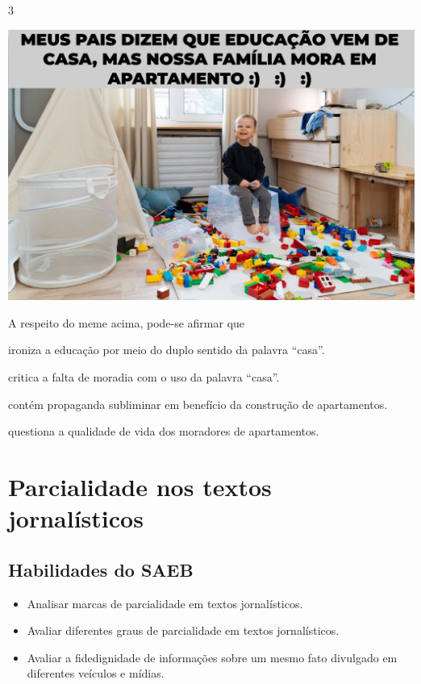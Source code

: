 \num{3}

\includegraphics[width=\textwidth]{./imgSAEB_7_POR/media/image7.png}

A respeito do meme acima, pode-se afirmar que

\begin{escolha}
    
    \item ironiza a educação por meio do duplo sentido da palavra ``casa''.
    
    \item critica a falta de moradia com o uso da palavra ``casa''.
    
    \item contém propaganda subliminar em benefício da construção de apartamentos.
    
    \item questiona a qualidade de vida dos moradores de apartamentos.

\end{escolha}


\chapter{Parcialidade nos textos jornalísticos}

\section{Habilidades do SAEB}

\begin{itemize}

  \item Analisar marcas de parcialidade em textos jornalísticos.

  \item Avaliar diferentes graus de parcialidade em textos jornalísticos.

  \item Avaliar a fidedignidade de informações sobre um mesmo fato divulgado 
  em diferentes veículos e mídias.

\end{itemize}

